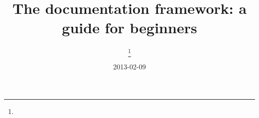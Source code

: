 \documentclass[
  pdftex,
  final,
  web,
  UKenglish,
  paper=a4,
  fontsize=11pt,
  DIV=11,
  BCOR=0mm,
  glossaries=totoc,
  glossaries/acronymstyle=default,
  glossaries/processor=makeindex,
  biblatex/style=default,
  biblatex/backend=bibtex8,
  biblatex/bibencoding=x-ascii
]{wlarticle}[2011/11/12]
\title{%
  The \wegcLaTeX{} documentation framework: \newline a guide for beginners%
}
\subtitle{%
}
\author{%
  \Name{mip}\thanks{\Address{wegc}}%
}
\date{%
  2013-02-09%
}
\begin{document}
\maketitle


\tableofcontents


\listoffigures


\listoftables


\lstlistoflistings
























\appendix




\todos
\end{document}
